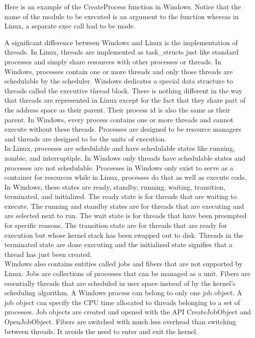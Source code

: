 \documentclass[letterpaper,10pt,titlepage]{article}
\begin{document}


Here is an example of the CreateProcess function in Windows. Notice that the
name of the module to be executed is an argument to the function whereas in
Linux, a separate exec call had to be made.



A significant difference between Windows and Linux is the implementation of 
threads. In Linux, threads are implemented as task\_structs just like 
standard processes and simply share resources with other processes or threads.
In Windows, processes contain one or more threads and only those threads are
schedulable by the scheduler. Windows dedicates a special data structure to 
threads called the executive thread block. There is nothing different in the
way that threads are represented in Linux except for the fact that they share
part of the address space as their parent. Their process id is also the same
as their parent. In Windows, every process contains one or more threads
and cannot execute without these threads. Processes are designed to be 
resource managers and threads are designed to be the units of execution.
\\
\linebreak
In Linux, processes are schedulable and have schedulable states like running,
zombie, and interruptiple. In Windows only threads have schedulable states and
processes are not schedulable. Processes in Windows only exist to serve as a
container for resources while in Linux, processes do that as well as execute 
code. In Windows, these states are ready, standby, running, waiting, 
transition, terminated, and initialized. The ready state is for threads 
that are waiting to execute. The running and standby states are for threads
that are executing and are selected next to run. The wait state is for 
threads that have been preempted for specific reasons. The transition state 
are for threads that are ready for execution but whose kernel stack has been
swapped out to disk. Threads in the terminated state are done executing
and the initialized state signifies that a thread has just been created. 
\\
\linebreak
Windows also contains entities called jobs and fibers that are not supported 
by Linux. Jobs are collections of processes that can be managed as a unit.
Fibers are essentially threads that are scheduled in user space instead of
by the kernel's scheduling algorithm. A Windows process can belong to only
one job object. A job object can specify the CPU time allocated to threads
belonging to a set of processes. Job objects are created and opened with the
API CreateJobObject and OpenJobObject. Fibers are switched with much less
overhead than switching between threads. It avoids the need to enter and 
exit the kernel.
\end{document}
